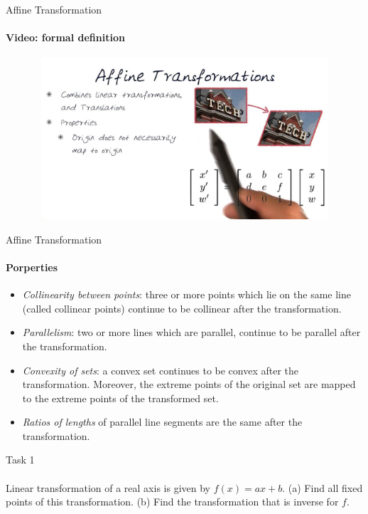\documentclass[aspectratio=169]{beamer}
\begin{document}
\begin{frame}[t]{Affine Transformation}
    \framesubtitle{Video: formal definition}
    \vspace{-0.6cm}
    \begin{figure}[H]
        \href{https://www.youtube.com/watch?v=il6Z5LCykZk}{
            \centering\includegraphics[height=6cm,width=1\textwidth,keepaspectratio]{formal_def.jpg}}
        \label{fig:formal_def.jpg}
    \end{figure}
\end{frame}

\begin{frame}[t]{Affine Transformation}
    \framesubtitle{Porperties}
        \begin{itemize}
            \item \textit{Collinearity between points}: three or more points which lie on the same line (called collinear points) continue to be collinear after the transformation.
            \item \textit{Parallelism}: two or more lines which are parallel, continue to be parallel after the transformation.
            \item \textit{Convexity of sets}: a convex set continues to be convex after the transformation. Moreover, the extreme points of the original set are mapped to the extreme points of the transformed set.
            \item \textit{Ratios of lengths} of parallel line segments are the same after the transformation.
        \end{itemize}
    \end{frame}

\begin{frame}[t]{Task 1}
    \framesubtitle{}
    Linear transformation of a real axis is given by $f(x)=ax+b$. (a) Find all fixed points of this transformation. (b) Find the transformation that is inverse for $f$.

\end{frame}
\end{document}
